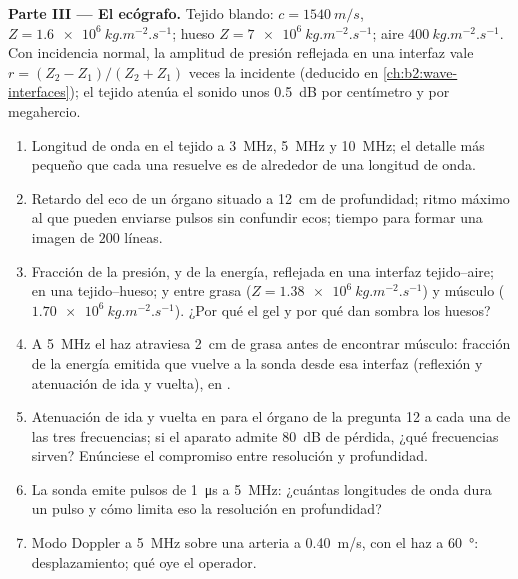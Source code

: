 \begin{problem}
\medskip
\noindent\textbf{Parte III --- El ecógrafo.}
Tejido blando: $c = \qty{1540}{m/s}$, $Z = \qty{1.6e6}{kg.m^{-2}.s^{-1}}$; hueso
$Z = \qty{7e6}{kg.m^{-2}.s^{-1}}$; aire $\qty{400}{kg.m^{-2}.s^{-1}}$. Con incidencia
normal, la amplitud de presión reflejada en una interfaz vale $r = (Z_2 -
Z_1)/(Z_2 + Z_1)$ veces la incidente (deducido en
\cref{ch:b2:wave-interfaces}); el tejido atenúa el sonido unos
\qty{0.5}{dB} por centímetro y por megahercio.
\begin{enumerate}[resume]
  \item Longitud de onda en el tejido a \qty{3}{MHz}, \qty{5}{MHz} y
        \qty{10}{MHz}; el detalle más pequeño que cada una resuelve es de
        alrededor de una longitud de onda.
  \item Retardo del eco de un órgano situado a \qty{12}{cm} de
        profundidad; ritmo máximo al que pueden enviarse pulsos sin
        confundir ecos; tiempo para formar una imagen de $200$ líneas.
  \item Fracción de la presión, y de la energía, reflejada en una interfaz
        tejido--aire; en una tejido--hueso; y entre grasa
        ($Z = \qty{1.38e6}{kg.m^{-2}.s^{-1}}$) y músculo
        ($\qty{1.70e6}{kg.m^{-2}.s^{-1}}$). ¿Por qué el gel y por qué dan
        sombra los huesos?
  \item A \qty{5}{MHz} el haz atraviesa \qty{2}{cm} de grasa antes de
        encontrar músculo: fracción de la energía emitida que vuelve a la
        sonda desde esa interfaz (reflexión y atenuación de ida y vuelta),
        en .
  \item Atenuación de ida y vuelta en  para el órgano de la
        pregunta 12 a cada una de las tres frecuencias; si el aparato
        admite \qty{80}{dB} de pérdida, ¿qué frecuencias sirven? Enúnciese
        el compromiso entre resolución y profundidad.
  \item La sonda emite pulsos de \qty{1}{\micro s} a \qty{5}{MHz}: ¿cuántas
        longitudes de onda dura un pulso y cómo limita eso la resolución
        en profundidad?
  \item Modo Doppler a \qty{5}{MHz} sobre una arteria a \qty{0.40}{m/s}, con
        el haz a \qty{60}{\degree}: desplazamiento; qué oye el operador.
\end{enumerate}


\end{problem}
